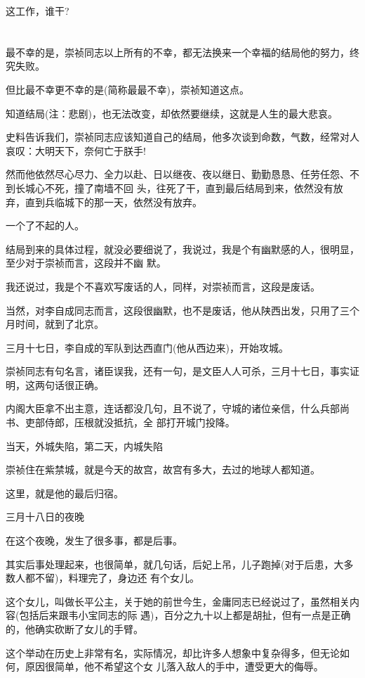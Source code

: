 \documentclass[11pt,a4paper,onecolumn]{article}
\begin{document}
这工作，谁干?

\section[\thesection]{}

最不幸的是，崇祯同志以上所有的不幸，都无法换来一个幸福的结局\myrule 他的努力，终究失败。

但比最不幸更不幸的是(简称最最不幸)，崇祯知道这点。

知道结局(注：悲剧)，也无法改变，却依然要继续，这就是人生的最大悲哀。

史料告诉我们，崇祯同志应该知道自己的结局，他多次谈到命数，气数，经常对人哀叹：大明天下，奈何亡于朕手!

然而他依然尽心尽力、全力以赴、日以继夜、夜以继日、勤勤恳恳、任劳任怨、不到长城心不死，撞了南墙不回
头，往死了干，直到最后结局到来，依然没有放弃，直到兵临城下的那一天，依然没有放弃。

一个了不起的人。

结局到来的具体过程，就没必要细说了，我说过，我是个有幽默感的人，很明显，至少对于崇祯而言，这段并不幽
默。

我还说过，我是个不喜欢写废话的人，同样，对崇祯而言，这段是废话。

当然，对李自成同志而言，这段很幽默，也不是废话，他从陕西出发，只用了三个月时间，就到了北京。

三月十七日，李自成的军队到达西直门(他从西边来)，开始攻城。

崇祯同志有句名言，诸臣误我，还有一句，是文臣人人可杀，三月十七日，事实证明，这两句话很正确。

内阁大臣拿不出主意，连话都没几句，且不说了，守城的诸位亲信，什么兵部尚书、吏部侍郎，压根就没抵抗，全
部打开城门投降。

当天，外城失陷，第二天，内城失陷

崇祯住在紫禁城，就是今天的故宫，故宫有多大，去过的地球人都知道。

这里，就是他的最后归宿。

三月十八日的夜晚

在这个夜晚，发生了很多事，都是后事。

其实后事处理起来，也很简单，就几句话，后妃上吊，儿子跑掉(对于后患，大多数人都不留)，料理完了，身边还
有个女儿。

这个女儿，叫做长平公主，关于她的前世今生，金庸同志已经说过了，虽然相关内容(包括后来跟韦小宝同志的际
遇)，百分之九十以上都是胡扯，但有一点是正确的，他确实砍断了女儿的手臂。

这个举动在历史上非常有名，实际情况，却比许多人想象中复杂得多，但无论如何，原因很简单，他不希望这个女
儿落入敌人的手中，遭受更大的侮辱。
\end{document}
